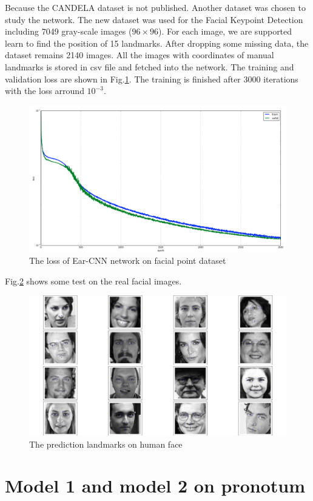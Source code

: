 \documentclass[12pt,a4paper]{article}
\begin{document}
Because the CANDELA dataset is not published. Another dataset was chosen to study the network. The new dataset was used for the Facial Keypoint Detection including 7049 gray-scale images ($96 \times 96$). For each image, we are supported learn to find the position of 15 landmarks. After dropping some missing data, the dataset remains 2140 images. All the images with coordinates of manual landmarks is stored in csv file and fetched into the network. The training and validation loss are shown in Fig.\ref{earLosstrain}. The training is finished after 3000 iterations with the loss arround $10^{-3}$.
\begin{figure}[h!]
	\centering
	\includegraphics[scale=0.27]{images/trainloss}
	\caption{The loss of Ear-CNN network on facial point dataset}
	\label{earLosstrain}
\end{figure}
Fig.\ref{earTest} shows some test on the real facial images.
\begin{figure}[h!]
	\centering
	\includegraphics[scale=0.27]{images/figure_1-1.png}
	\caption{The prediction landmarks on human face}
	\label{earTest}
\end{figure}
\section{Model 1 and model 2 on pronotum}
\end{document}
